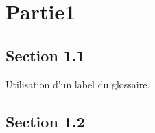 \chapter{Partie1}
\pagestyle{IHA-fancy-style}
    \section{Section 1.1}
    	Utilisation d'un \gls{label} du glossaire.
    \section{Section 1.2}